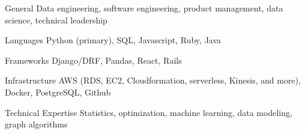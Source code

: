 

\begin{cvskills}
  \cvskill
    {General}
    {Data engineering, software engineering, product management, data science, technical leadership}

  \cvskill
    {Languages}
    {Python (primary), SQL, Javascript, Ruby, Java}

  \cvskill
    {Frameworks}
    {Django/DRF, Pandas, React, Rails}

  \cvskill
    {Infrastructure}
    {AWS (RDS, EC2, Cloudformation, serverless, Kinesis, and more), Docker, PostgreSQL, Github}

  \cvskill
    {Technical Expertise}
    {Statistics, optimization, machine learning, data modeling, graph algorithms}
\end{cvskills}
